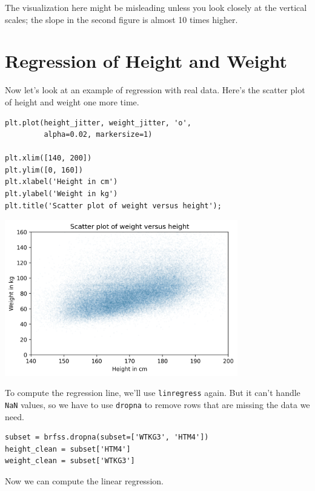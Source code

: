The visualization here might be misleading unless you look closely at
the vertical scales; the slope in the second figure is almost 10 times
higher.

\hypertarget{regression-of-height-and-weight}{%
\section{Regression of Height and
Weight}\label{regression-of-height-and-weight}}

Now let's look at an example of regression with real data. Here's the
scatter plot of height and weight one more time.

\begin{lstlisting}[]
plt.plot(height_jitter, weight_jitter, 'o', 
         alpha=0.02, markersize=1)

plt.xlim([140, 200])
plt.ylim([0, 160])
plt.xlabel('Height in cm')
plt.ylabel('Weight in kg')
plt.title('Scatter plot of weight versus height');
\end{lstlisting}

\begin{center}
\includegraphics[width=4in]{chapters/09_relationships_files/09_relationships_92_0.png}
\end{center}

To compute the regression line, we'll use
\passthrough{\lstinline!linregress!} again. But it can't handle
\passthrough{\lstinline!NaN!} values, so we have to use
\passthrough{\lstinline!dropna!} to remove rows that are missing the
data we need.

\begin{lstlisting}[]
subset = brfss.dropna(subset=['WTKG3', 'HTM4'])
height_clean = subset['HTM4']
weight_clean = subset['WTKG3']
\end{lstlisting}

Now we can compute the linear regression.

